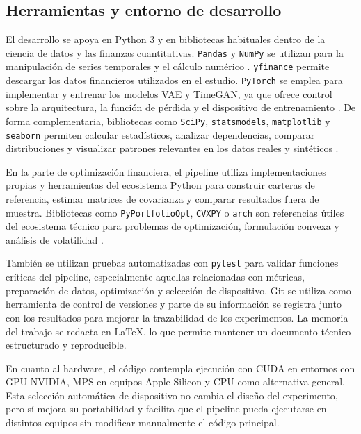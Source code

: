 \documentclass[11pt,a4paper,spanish,oneside]{book}
\numberwithin{equation}{chapter}
\numberwithin{figure}{chapter}
\begin{document}
\subsection{Herramientas y entorno de desarrollo}

El desarrollo se apoya en Python 3 y en bibliotecas habituales dentro de la ciencia de datos y las finanzas cuantitativas. \texttt{Pandas} y \texttt{NumPy} se utilizan para la manipulación de series temporales y el cálculo numérico \cite{Harris2020,McKinney2010}. \texttt{yfinance} permite descargar los datos financieros utilizados en el estudio. \texttt{PyTorch} se emplea para implementar y entrenar los modelos VAE y TimeGAN, ya que ofrece control sobre la arquitectura, la función de pérdida y el dispositivo de entrenamiento \cite{Paszke2019}. De forma complementaria, bibliotecas como \texttt{SciPy}, \texttt{statsmodels}, \texttt{matplotlib} y \texttt{seaborn} permiten calcular estadísticos, analizar dependencias, comparar distribuciones y visualizar patrones relevantes en los datos reales y sintéticos \cite{Virtanen2020,Seabold2010}.

En la parte de optimización financiera, el pipeline utiliza implementaciones propias y herramientas del ecosistema Python para construir carteras de referencia, estimar matrices de covarianza y comparar resultados fuera de muestra. Bibliotecas como \texttt{PyPortfolioOpt}, \texttt{CVXPY} o \texttt{arch} son referencias útiles del ecosistema técnico para problemas de optimización, formulación convexa y análisis de volatilidad \cite{Martin2021,Diamond2016,Sheppard2024}.

También se utilizan pruebas automatizadas con \texttt{pytest} para validar funciones críticas del pipeline, especialmente aquellas relacionadas con métricas, preparación de datos, optimización y selección de dispositivo. Git se utiliza como herramienta de control de versiones y parte de su información se registra junto con los resultados para mejorar la trazabilidad de los experimentos. La memoria del trabajo se redacta en LaTeX, lo que permite mantener un documento técnico estructurado y reproducible.

En cuanto al hardware, el código contempla ejecución con CUDA en entornos con GPU NVIDIA, MPS en equipos Apple Silicon y CPU como alternativa general. Esta selección automática de dispositivo no cambia el diseño del experimento, pero sí mejora su portabilidad y facilita que el pipeline pueda ejecutarse en distintos equipos sin modificar manualmente el código principal.
\end{document}
